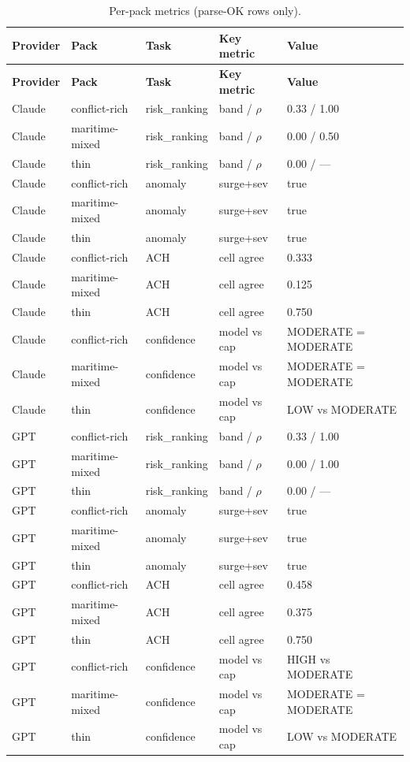 \documentclass[11pt,a4paper]{article}
\begin{document}
\begin{center}
\begin{longtable}{@{}lllll@{}}
\caption{Per-pack metrics (parse-OK rows only).}\label{tab:perpack}\\
\toprule
\textbf{Provider} & \textbf{Pack} & \textbf{Task} & \textbf{Key metric} & \textbf{Value} \\
\midrule
\endfirsthead
\toprule
\textbf{Provider} & \textbf{Pack} & \textbf{Task} & \textbf{Key metric} & \textbf{Value} \\
\midrule
\endhead
\bottomrule
\endfoot

Claude & conflict-rich & risk\_ranking & band / $\rho$ & 0.33 / 1.00 \\
Claude & maritime-mixed & risk\_ranking & band / $\rho$ & 0.00 / 0.50 \\
Claude & thin & risk\_ranking & band / $\rho$ & 0.00 / --- \\
Claude & conflict-rich & anomaly & surge+sev & true \\
Claude & maritime-mixed & anomaly & surge+sev & true \\
Claude & thin & anomaly & surge+sev & true \\
Claude & conflict-rich & ACH & cell agree & 0.333 \\
Claude & maritime-mixed & ACH & cell agree & 0.125 \\
Claude & thin & ACH & cell agree & 0.750 \\
Claude & conflict-rich & confidence & model vs cap & MODERATE = MODERATE \\
Claude & maritime-mixed & confidence & model vs cap & MODERATE = MODERATE \\
Claude & thin & confidence & model vs cap & LOW vs MODERATE \\
GPT & conflict-rich & risk\_ranking & band / $\rho$ & 0.33 / 1.00 \\
GPT & maritime-mixed & risk\_ranking & band / $\rho$ & 0.00 / 1.00 \\
GPT & thin & risk\_ranking & band / $\rho$ & 0.00 / --- \\
GPT & conflict-rich & anomaly & surge+sev & true \\
GPT & maritime-mixed & anomaly & surge+sev & true \\
GPT & thin & anomaly & surge+sev & true \\
GPT & conflict-rich & ACH & cell agree & 0.458 \\
GPT & maritime-mixed & ACH & cell agree & 0.375 \\
GPT & thin & ACH & cell agree & 0.750 \\
GPT & conflict-rich & confidence & model vs cap & HIGH vs MODERATE \\
GPT & maritime-mixed & confidence & model vs cap & MODERATE = MODERATE \\
GPT & thin & confidence & model vs cap & LOW vs MODERATE \\
\end{longtable}
\end{center}
\end{document}
